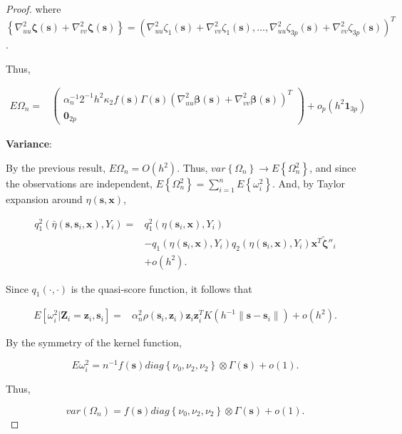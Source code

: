 \documentclass[authoryear,review, 12pt]{elsarticle}
\begin{document}
\begin{proof}
where $\left\{ \nabla_{uu}^{2}\bm{\zeta}\left(\bm{s}\right)+\nabla_{vv}^{2}\bm{\zeta}\left(\bm{s}\right)\right\} =\left(\nabla_{uu}^{2}\zeta_{1}\left(\bm{s}\right)+\nabla_{vv}^{2}\zeta_{1}\left(\bm{s}\right),\dots,\nabla_{uu}^{2}\zeta_{3p}\left(\bm{s}\right)+\nabla_{vv}^{2}\zeta_{3p}\left(\bm{s}\right)\right)^{T}$.

Thus,

\begin{align*}
E\Omega_{n}= & \left(\begin{array}{c}
\alpha_{n}^{-1}2^{-1}h^{2}\kappa_{2}f\left(\bm{s}\right)\Gamma\left(\bm{s}\right)\left(\nabla_{uu}^{2}\bm{\beta}\left(\bm{s}\right)+\nabla_{vv}^{2}\bm{\beta}\left(\bm{s}\right)\right)^{T}\\
\bm{0}_{2p}
\end{array}\right)+o_{p}\left(h^{2}\bm{1}_{3p}\right)
\end{align*}


\textbf{Variance}:

By the previous result, $E\Omega_{n}=O\left(h^{2}\right)$. Thus,
$var\left\{ \Omega_{n}\right\} \to E\left\{ \Omega_{n}^{2}\right\} $,
and since the observations are independent, $E\left\{ \Omega_{n}^{2}\right\} =\sum_{i=1}^{n}E\left\{ \omega_{i}^{2}\right\} $.
And, by Taylor expansion around $\eta\left(\bm{s},\bm{x}\right)$, 

\begin{align*}
q_{1}^{2}\left(\bar{\eta}\left(\bm{s},\bm{s}_{i},\bm{x}\right),Y_{i}\right)= & q_{1}^{2}\left(\eta\left(\bm{s}_{i},\bm{x}\right),Y_{i}\right)\\
 & -q_{1}\left(\eta\left(\bm{s}_{i},\bm{x}\right),Y_{i}\right)q_{2}\left(\eta\left(\bm{s}_{i},\bm{x}\right),Y_{i}\right)\bm{x}^{T}\tilde{\bm{\zeta}}''_{i}\\
 & +o\left(h^{2}\right).
\end{align*}


Since $q_{1}\left(\cdot,\cdot\right)$ is the quasi-score function,
it follows that 

\begin{align*}
E\left[\omega_{i}^{2}|\bm{Z}_{i}=\bm{z}_{i},\bm{s}_{i}\right]= & \alpha_{n}^{2}\rho\left(\bm{s}_{i},\bm{z}_{i}\right)\bm{z}_{i}\bm{z}_{i}^{T}K\left(h^{-1}\|\bm{s}-\bm{s}_{i}\|\right)+o\left(h^{2}\right).
\end{align*}


By the symmetry of the kernel function,

\[
E\omega_{i}^{2}=n^{-1}f\left(\bm{s}\right)diag\left\{ \nu_{0},\nu_{2},\nu_{2}\right\} \otimes\Gamma\left(\bm{s}\right)+o\left(1\right).
\]


Thus, 

\[
var\left(\Omega_{n}\right)=f\left(\bm{s}\right)diag\left\{ \nu_{0},\nu_{2},\nu_{2}\right\} \otimes\Gamma\left(\bm{s}\right)+o\left(1\right).
\]

\end{proof}
\end{document}
